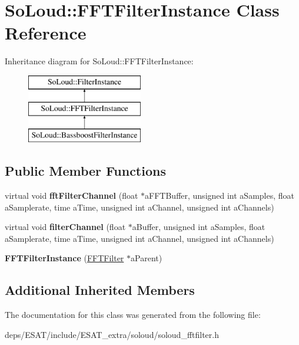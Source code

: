 \hypertarget{class_so_loud_1_1_f_f_t_filter_instance}{}\section{So\+Loud\+:\+:F\+F\+T\+Filter\+Instance Class Reference}
\label{class_so_loud_1_1_f_f_t_filter_instance}
Inheritance diagram for So\+Loud\+:\+:F\+F\+T\+Filter\+Instance\+:\begin{figure}[H]
\begin{center}
\leavevmode
\includegraphics[height=3.000000cm]{class_so_loud_1_1_f_f_t_filter_instance}
\end{center}
\end{figure}
\subsection*{Public Member Functions}
\begin{DoxyCompactItemize}
\item 
\mbox{\label{class_so_loud_1_1_f_f_t_filter_instance_a6968362e2c8d2ff62064b3f3c010de75}} 
virtual void {\bfseries fft\+Filter\+Channel} (float $\ast$a\+F\+F\+T\+Buffer, unsigned int a\+Samples, float a\+Samplerate, time a\+Time, unsigned int a\+Channel, unsigned int a\+Channels)
\item 
\mbox{\label{class_so_loud_1_1_f_f_t_filter_instance_ac110bb616aa490437b4b5b97a8ffd6f8}} 
virtual void {\bfseries filter\+Channel} (float $\ast$a\+Buffer, unsigned int a\+Samples, float a\+Samplerate, time a\+Time, unsigned int a\+Channel, unsigned int a\+Channels)
\item 
\mbox{\label{class_so_loud_1_1_f_f_t_filter_instance_a00e5d27d93741b35910581ef36c003fa}} 
{\bfseries F\+F\+T\+Filter\+Instance} (\mbox{\hyperlink{class_so_loud_1_1_f_f_t_filter}{F\+F\+T\+Filter}} $\ast$a\+Parent)
\end{DoxyCompactItemize}
\subsection*{Additional Inherited Members}


The documentation for this class was generated from the following file\+:\begin{DoxyCompactItemize}
\item 
deps/\+E\+S\+A\+T/include/\+E\+S\+A\+T\+\_\+extra/soloud/soloud\+\_\+fftfilter.\+h\end{DoxyCompactItemize}
